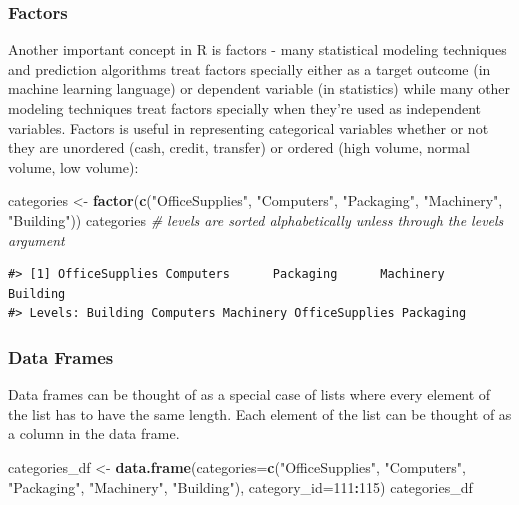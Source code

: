 \documentclass[]{article}
\newenvironment{Shaded}{\begin{snugshade}}{\end{snugshade}}
\newcommand{\CommentTok}[1]{\textcolor[rgb]{0.56,0.35,0.01}{\textit{#1}}}
\newcommand{\DataTypeTok}[1]{\textcolor[rgb]{0.13,0.29,0.53}{#1}}
\newcommand{\DecValTok}[1]{\textcolor[rgb]{0.00,0.00,0.81}{#1}}
\newcommand{\KeywordTok}[1]{\textcolor[rgb]{0.13,0.29,0.53}{\textbf{#1}}}
\newcommand{\NormalTok}[1]{#1}
\newcommand{\OperatorTok}[1]{\textcolor[rgb]{0.81,0.36,0.00}{\textbf{#1}}}
\newcommand{\StringTok}[1]{\textcolor[rgb]{0.31,0.60,0.02}{#1}}
\begin{document}
\hypertarget{factors}{%
\subsubsection{Factors}\label{factors}}

Another important concept in R is factors - many statistical modeling
techniques and prediction algorithms treat factors specially either as a
target outcome (in machine learning language) or dependent variable (in
statistics) while many other modeling techniques treat factors specially
when they're used as independent variables. Factors is useful in
representing categorical variables whether or not they are unordered
(cash, credit, transfer) or ordered (high volume, normal volume, low
volume):

\begin{Shaded}
\begin{Highlighting}[]
\NormalTok{categories <-}\StringTok{ }\KeywordTok{factor}\NormalTok{(}\KeywordTok{c}\NormalTok{(}\StringTok{"OfficeSupplies"}\NormalTok{, }\StringTok{"Computers"}\NormalTok{, }\StringTok{"Packaging"}\NormalTok{, }\StringTok{"Machinery"}\NormalTok{, }\StringTok{"Building"}\NormalTok{))}
\NormalTok{categories }\CommentTok{# levels are sorted alphabetically unless through the levels argument}
\end{Highlighting}
\end{Shaded}

\begin{verbatim}
#> [1] OfficeSupplies Computers      Packaging      Machinery      Building      
#> Levels: Building Computers Machinery OfficeSupplies Packaging
\end{verbatim}

\hypertarget{data-frames}{%
\subsubsection{Data Frames}\label{data-frames}}

Data frames can be thought of as a special case of lists where every
element of the list has to have the same length. Each element of the
list can be thought of as a column in the data frame.

\begin{Shaded}
\begin{Highlighting}[]
\NormalTok{categories_df <-}\StringTok{ }\KeywordTok{data.frame}\NormalTok{(}\DataTypeTok{categories=}\KeywordTok{c}\NormalTok{(}\StringTok{"OfficeSupplies"}\NormalTok{, }\StringTok{"Computers"}\NormalTok{, }\StringTok{"Packaging"}\NormalTok{, }\StringTok{"Machinery"}\NormalTok{, }\StringTok{"Building"}\NormalTok{), }\DataTypeTok{category_id=}\DecValTok{111}\OperatorTok{:}\DecValTok{115}\NormalTok{)}
\NormalTok{categories_df}
\end{Highlighting}
\end{Shaded}
\end{document}
